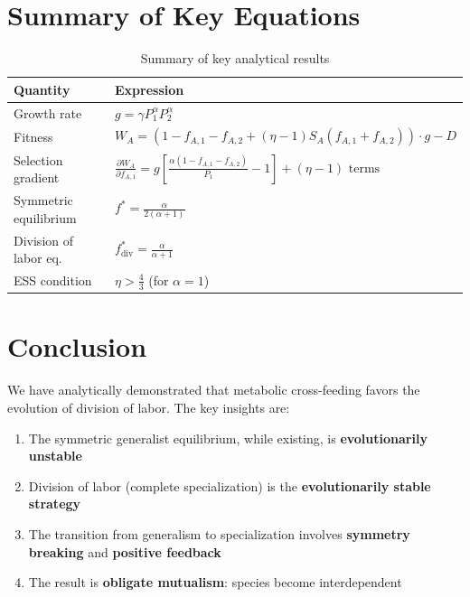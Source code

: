 \documentclass[11pt]{article}
\theoremstyle{definition}
\theoremstyle{remark}
\newcommand{\pd}[2]{\frac{\partial #1}{\partial #2}}
\begin{document}
\section{Summary of Key Equations}

\begin{table}[h]
\centering
\caption{Summary of key analytical results}
\begin{tabular}{ll}
\toprule
\textbf{Quantity} & \textbf{Expression} \\
\midrule
Growth rate & $g = \gamma P_1^{\alpha} P_2^{\alpha}$ \\
Fitness & $W_A = (1 - f_{A,1} - f_{A,2} + (\eta-1)S_A(f_{A,1}+f_{A,2})) \cdot g - D$ \\
Selection gradient & $\displaystyle\pd{W_A}{f_{A,1}} = g\left[\frac{\alpha(1-f_{A,1}-f_{A,2})}{P_1} - 1\right] + (\eta-1)\text{ terms}$ \\
Symmetric equilibrium & $f^* = \frac{\alpha}{2(\alpha+1)}$ \\
Division of labor eq. & $f^*_{\text{div}} = \frac{\alpha}{\alpha+1}$ \\
ESS condition & $\eta > \frac{4}{3}$ (for $\alpha = 1$) \\
\bottomrule
\end{tabular}
\end{table}

\section{Conclusion}

We have analytically demonstrated that metabolic cross-feeding favors the evolution of division of labor. The key insights are:

\begin{enumerate}
    \item The symmetric generalist equilibrium, while existing, is \textbf{evolutionarily unstable}
    \item Division of labor (complete specialization) is the \textbf{evolutionarily stable strategy}
    \item The transition from generalism to specialization involves \textbf{symmetry breaking} and \textbf{positive feedback}
    \item The result is \textbf{obligate mutualism}: species become interdependent
\end{enumerate}
\end{document}
